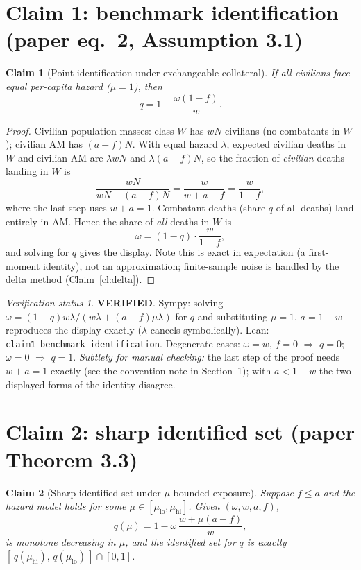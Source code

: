 \documentclass[11pt,a4paper]{article}
\theoremstyle{plain}
\newtheorem{claim}{Claim}
\theoremstyle{remark}
\newtheorem*{verification}{Verification status}
\newcommand{\PASS}{\textcolor{green!50!black}{\textbf{VERIFIED}}}
\begin{document}
\section{Claim 1: benchmark identification (paper eq.~2, Assumption 3.1)}

\begin{claim}[Point identification under exchangeable collateral]\label{cl:ident}
If all civilians face equal per-capita hazard ($\mu=1$), then
\[
q = 1-\frac{\omega(1-f)}{w}.
\]
\end{claim}

\begin{proof}
Civilian population masses: class $W$ has $wN$ civilians (no combatants in $W$); civilian $\mathrm{AM}$ has $(a-f)N$. With equal hazard $\lambda$, expected civilian deaths in $W$ and civilian-$\mathrm{AM}$ are $\lambda wN$ and $\lambda(a-f)N$, so the fraction of \emph{civilian} deaths landing in $W$ is
\[
\frac{wN}{wN+(a-f)N} = \frac{w}{w+a-f} = \frac{w}{1-f},
\]
where the last step uses $w+a=1$. Combatant deaths (share $q$ of all deaths) land entirely in $\mathrm{AM}$. Hence the share of \emph{all} deaths in $W$ is
\[
\omega = (1-q)\cdot\frac{w}{1-f},
\]
and solving for $q$ gives the display. Note this is exact in expectation (a first-moment identity), not an approximation; finite-sample noise is handled by the delta method (Claim~\ref{cl:delta}).
\end{proof}

\begin{verification}
\PASS. Sympy: solving $\omega=(1-q)w\lambda/(w\lambda+(a-f)\mu\lambda)$ for $q$ and substituting $\mu=1$, $a=1-w$ reproduces the display exactly ($\lambda$ cancels symbolically). Lean: \texttt{claim1\_benchmark\_identification}. Degenerate cases: $\omega=w$, $f=0$ $\Rightarrow$ $q=0$; $\omega=0$ $\Rightarrow$ $q=1$. \emph{Subtlety for manual checking:} the last step of the proof needs $w+a=1$ exactly (see the convention note in Section~1); with $a<1-w$ the two displayed forms of the identity disagree.
\end{verification}

\section{Claim 2: sharp identified set (paper Theorem 3.3)}

\begin{claim}[Sharp identified set under $\mu$-bounded exposure]\label{cl:sharp}
Suppose $f\le a$ and the hazard model holds for some $\mu\in[\mu_{\mathrm{lo}},\mu_{\mathrm{hi}}]$. Given $(\omega,w,a,f)$,
\[
q(\mu) = 1-\omega\,\frac{w+\mu(a-f)}{w},
\]
is monotone decreasing in $\mu$, and the identified set for $q$ is exactly
$[\,q(\mu_{\mathrm{hi}}),\,q(\mu_{\mathrm{lo}})\,]\cap[0,1]$.
\end{claim}
\end{document}
